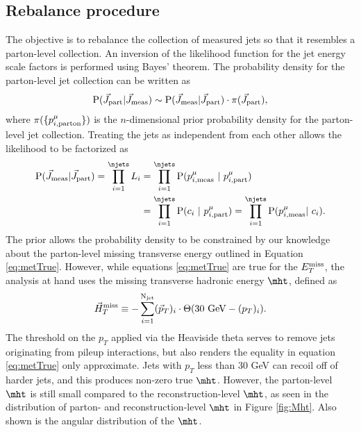 \subsection{Rebalance procedure}
The objective is to rebalance the collection of measured jets so that it resembles a parton-level collection. An inversion of the likelihood function for the jet energy scale factors is performed using Bayes' theorem. The probability density for the parton-level jet collection can be written as
\begin{equation}
{\rm P}(\vec{J}_{\rm part}|\vec{J}_{\rm meas}) \sim {\rm P}(\vec{J}_{\rm meas}|\vec{J}_{\rm part})\cdot \pi(\vec{J}_{\rm part}),
\label{eq:posterior1}
\end{equation}
where $\pi(\{p^{\mu}_{i,\rm parton}\})$ is the $n$-dimensional prior probability density for the parton-level jet collection.
Treating the jets as independent from each other allows the likelihood to be factorized as
\begin{align}
\begin{split}
{\rm P}(\vec{J}_{\rm meas}|\vec{J}_{\rm part}) = \prod_{i=1}^{\njets}L_{i} &= \prod_{i=1}^{\njets}{\rm P}(p^{\mu}_{i,\rm meas}\ |\ p^{\mu}_{i,\rm part})\\
&= \prod_{i=1}^{\njets}{\rm P}(c_i\ |\ p^{\mu}_{i,\rm part})=\prod_{i=1}^{\njets}{\rm P}(p^{\mu}_{i,\rm meas}|\ c_{i}).
\end{split}
\label{eq:likelihood1}
\end{align}
The prior allows the probability density to be constrained by our knowledge about the parton-level missing transverse energy outlined in Equation \ref{eq:metTrue}. However, while equations \ref{eq:metTrue} are true for the $E_{T}^{\rm miss}$, the analysis at hand uses the missing transverse hadronic energy $\mht$, defined as
\begin{equation}
\vec{H}_{T}^{\rm miss} \equiv -\sum_{i=1}^{{\rm N}_{\rm jet}}(\vec{p}_{T})_{i}\cdot\Theta(30{\rm\ GeV}-(p_{T})_{i}).
\end{equation}
The threshold on the $p_{T}$ applied via the Heaviside theta serves to remove jets originating from pileup interactions, but also renders the equality in equation \ref{eq:metTrue} only approximate. Jets with $p_{T}$ less than 30 GeV can recoil off of harder jets, and this produces non-zero true $\mht$. However, the parton-level $\mht$ is still small compared to the reconstruction-level $\mht$, as seen in the distribution of parton- and reconstruction-level $\mht$ in Figure \ref{fig:Mht}. Also shown is the angular distribution of the $\mht$.
